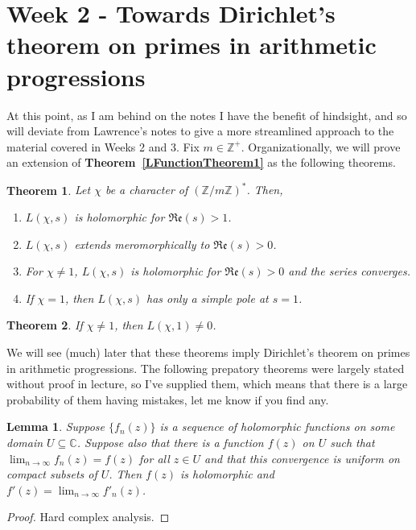 \documentclass[12pt]{article}
\newcommand{\ints}{\mathbb{Z}}
\newcommand{\complex}{\mathbb{C}}
\newcommand{\intsmod}[1]{\ints / #1 \ints}
\newcommand{\tref}[1]{\textbf{Theorem~\ref{#1}}}
\newtheorem{thm}{Theorem}
\newtheorem{lemma}{Lemma}
\numberwithin{equation}{section}
\numberwithin{thm}{section}
\numberwithin{lemma}{section}
\numberwithin{cor}{section}
\begin{document}
\section{Week 2 - Towards Dirichlet's theorem on primes in arithmetic progressions}

At this point, as I am behind on the notes I have the benefit of hindsight, and so will deviate from Lawrence's notes to give a more streamlined approach to the material covered in Weeks 2 and 3. Fix $m \in \ints^+$. Organizationally, we will prove an extension of \tref{LFunctionTheorem1} as the following theorems.

\begin{thm}\label{LFunctionSubTheorems1}
  Let $\chi$ be a character of $(\intsmod{m})^*$. Then, \begin{enumerate}
    \item $L(\chi, s)$ is holomorphic for $\mathfrak{Re}(s) > 1$.
    \item $L(\chi, s)$ extends meromorphically to $\mathfrak{Re}(s) > 0$.
    \item For $\chi \ne 1$, $L(\chi, s)$ is holomorphic for $\mathfrak{Re}(s) > 0$ and the series converges.
    \item If $\chi = 1$, then $L(\chi, s)$ has only a simple pole at $s=1$.
  \end{enumerate}
\end{thm}

\begin{thm}\label{LFunctionDoesntVanish}
  If $\chi \ne 1$, then $L(\chi, 1) \ne 0$.
\end{thm}

We will see (much) later that these theorems imply Dirichlet's theorem on primes in arithmetic progressions. The following prepatory theorems were largely stated without proof in lecture, so I've supplied them, which means that there is a large probability of them having mistakes, let me know if you find any.

\begin{lemma}\label{ConvergenceOnCompactImpliesConvergenceEverywhere}
  Suppose $\{f_n(z) \}$ is a sequence of holomorphic functions on some domain $U \subseteq \complex$. Suppose also that there is a function $f(z)$ on $U$ such that $\lim_{n \to \infty} f_n(z) = f(z)$ for all $z \in U$ and that this convergence is uniform on compact subsets of $U$. Then $f(z)$ is holomorphic and $f'(z) = \lim_{n \to \infty} f'_n(z)$. 
\end{lemma}
\begin{proof}
  Hard complex analysis.
\end{proof}
\end{document}
